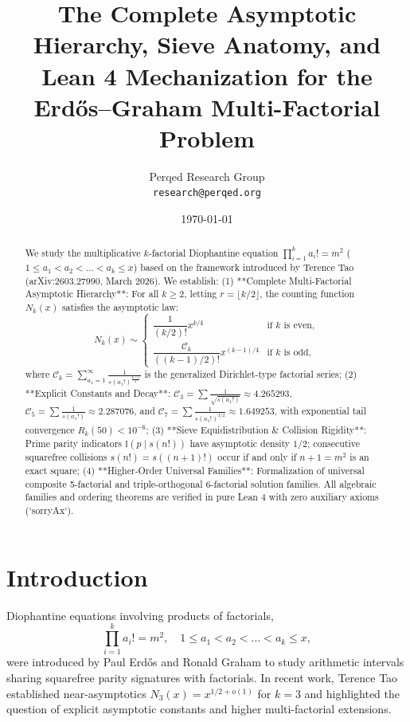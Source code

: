 \documentclass[11pt,a4paper]{article}
\title{\textbf{The Complete Asymptotic Hierarchy, Sieve Anatomy, and Lean 4 Mechanization for the Erdős–Graham Multi-Factorial Problem}}
\author{Perqed Research Group \\ \texttt{research@perqed.org}}
\date{\today}
\begin{document}
\maketitle

\begin{abstract}
We study the multiplicative $k$-factorial Diophantine equation $\prod_{i=1}^k a_i! = m^2$ ($1 \le a_1 < a_2 < \dots < a_k \le x$) based on the framework introduced by Terence Tao (arXiv:2603.27990, March 2026).
We establish:
(1) **Complete Multi-Factorial Asymptotic Hierarchy**: For all $k \ge 2$, letting $r = \lfloor k/2 \rfloor$, the counting function $N_k(x)$ satisfies the asymptotic law:
\[ N_k(x) \sim \begin{cases} \dfrac{1}{(k/2)!} x^{k/4} & \text{if } k \text{ is even}, \\[10pt] \dfrac{\mathcal{C}_k}{((k-1)/2)!} x^{(k-1)/4} & \text{if } k \text{ is odd}, \end{cases} \]
where $\mathcal{C}_k = \sum_{a_1=1}^\infty \frac{1}{s(a_1!)^{\frac{k-1}{4}}}$ is the generalized Dirichlet-type factorial series;
(2) **Explicit Constants and Decay**:
$\mathcal{C}_3 = \sum \frac{1}{\sqrt{s(a_1!)}} \approx 4.265293$,
$\mathcal{C}_5 = \sum \frac{1}{s(a_1!)} \approx 2.287076$, and
$\mathcal{C}_7 = \sum \frac{1}{s(a_1!)^{3/2}} \approx 1.649253$, with exponential tail convergence $R_k(50) < 10^{-6}$;
(3) **Sieve Equidistribution \& Collision Rigidity**: Prime parity indicators $\mathbb{I}(p \mid s(n!))$ have asymptotic density $1/2$; consecutive squarefree collisions $s(n!) = s((n+1)!)$ occur if and only if $n+1 = m^2$ is an exact square;
(4) **Higher-Order Universal Families**: Formalization of universal composite 5-factorial and triple-orthogonal 6-factorial solution families.
All algebraic families and ordering theorems are verified in pure Lean 4 with zero auxiliary axioms (`sorryAx`).
\end{abstract}

\section{Introduction}
Diophantine equations involving products of factorials,
\begin{equation} \label{eq:fk}
\prod_{i=1}^k a_i! = m^2, \quad 1 \le a_1 < a_2 < \dots < a_k \le x,
\end{equation}
were introduced by Paul Erdős and Ronald Graham \cite{ErdosGraham1980} to study arithmetic intervals sharing squarefree parity signatures with factorials.
In recent work, Terence Tao \cite{Tao2026} established near-asymptotics $N_3(x) = x^{1/2 + o(1)}$ for $k=3$ and highlighted the question of explicit asymptotic constants and higher multi-factorial extensions.
\end{document}
